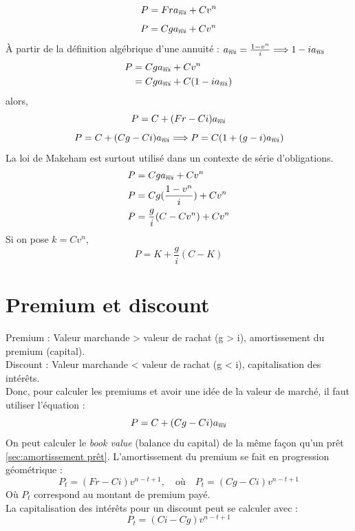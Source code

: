 \documentclass[11pt,french]{report}
\makeatletter
\DeclareRobustCommand{\annuity}[1]{%
\def\arraystretch{0}%
\setlength\arraycolsep{.7pt}%
\setlength\arrayrulewidth{.3pt}%
\begin{array}[b]{@{}c|}\hline
\\[\arraycolsep]%
\scriptstyle #1%
\end{array}%
}
\makeatother
\begin{document}
\begin{equation}
P = Fr a_{\annuity{n}i} + Cv^{n}
\end{equation}
\begin{equation}
P = Cg a_{\annuity{n}i} + Cv^{n}
\end{equation}
À partir de la définition algébrique d'une annuité : $ a_{\annuity{n}i} = \frac{1 -v ^{n}}{i} \Longrightarrow 1- ia_{\annuity{n}i} $
\begin{align*}
P & = Cg a_{\annuity{n}i} + Cv^{n} \\
& = Cg a_{\annuity{n}i} + C(1- ia_{\annuity{n}i})
\end{align*}
alors, 
\begin{equation}
P = C + (Fr - Ci)a_{\annuity{n}i}
\end{equation}
\begin{equation}
P = C + (Cg - Ci)a_{\annuity{n}i} \Longrightarrow P = C( 1 + (g - i)a_{\annuity{n}i})
\end{equation}
La loi de Makeham est surtout utilisé dans un contexte de série d'obligations.
\begin{align*}
P & = Cg a_{\annuity{n}i} + Cv^{n} \\
P & = Cg (\frac{1 - v^{n}}{i}) + Cv^{n} \\
P & =  \frac{g}{i}(C-Cv^{n}) + Cv^{n}
\end{align*}
Si on pose $k = Cv^{n}$,
\begin{equation}
P =  K + \frac{g}{i}(C-K)
\end{equation}

\section{Premium et discount}
\label{sec:premium et discount}

Premium : Valeur marchande > valeur de rachat (g > i), amortissement du premium (capital).
\\Discount : Valeur marchande < valeur de rachat (g < i), capitalisation des intérêts.
\\Donc, pour calculer les premiums et avoir une idée de la valeur de marché, il faut utiliser l'équation :
\begin{equation}
P = C + (Cg - Ci)a_{\annuity{n}i}
\end{equation}
On peut calculer le \textit{book value} (balance du capital) de la même façon qu'un prêt \ref{sec:amortissement prêt}. L'amortissement du premium se fait en progression géométrique :
\begin{equation}
P_t = (Fr - Ci)v^{n-t+1}, \quad \text{où} \quad P_t = (Cg - Ci)v^{n-t+1}
\end{equation}
Où $P_t$ correspond au montant de premium payé.
\\La capitalisation des intérêts pour un discount peut se calculer avec :
\begin{equation}
P_t = (Ci -Cg)v^{n-t+1}
\end{equation}
\end{document}
